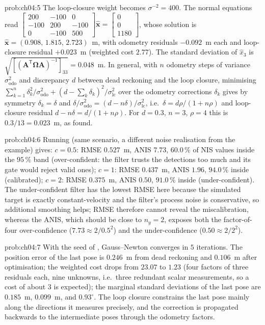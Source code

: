 \begin{sol}{prob:ch04:5}
The loop-closure weight becomes $\sigma^{-2}=400$. The normal equations read
$\begin{bmatrix}200&-100&0\\-100&200&-100\\0&-100&500\end{bmatrix}\widehat{\mathbf{x}}=\begin{bmatrix}0\\0\\1180\end{bmatrix}$, whose solution is $\widehat{\mathbf{x}}=(0.908,\,1.815,\,2.723)$~m, with odometry residuals $-0.092$~m each and loop-closure residual $+0.023$~m (weighted cost $2.77$). The standard deviation of $\widehat{x}_3$ is $\sqrt{[(\mathbf{A}^{\mathsf T}\mathbf{\Omega}\mathbf{A})^{-1}]_{33}}=0.048$~m. In general, with $n$ odometry steps of variance $\sigma_{\mathrm{odo}}^{2}$ and discrepancy $d$ between dead reckoning and the loop closure, minimising $\sum_{k=1}^{n}\delta_k^{2}/\sigma_{\mathrm{odo}}^{2}+(d-\sum_k\delta_k)^{2}/\sigma_{\mathrm{lc}}^{2}$ over the odometry corrections $\delta_k$ gives by symmetry $\delta_k=\delta$ and $\delta/\sigma_{\mathrm{odo}}^{2}=(d-n\delta)/\sigma_{\mathrm{lc}}^{2}$, i.e.\ $\delta=d\rho/(1+n\rho)$ and loop-closure residual $d-n\delta=d/(1+n\rho)$. For $d=0.3$, $n=3$, $\rho=4$ this is $0.3/13=0.023$~m, as found.
\end{sol}
\begin{sol}{prob:ch04:6}
Running  (same scenario, a different noise realisation from the example) gives: $c=0.5$: RMSE $0.527$~m, ANIS $7.73$, $60.0\,\%$ of NIS values inside the $95\,\%$ band (over-confident: the filter trusts the detections too much and its gate would reject valid ones); $c=1$: RMSE $0.437$~m, ANIS $1.96$, $94.0\,\%$ inside (calibrated); $c=2$: RMSE $0.375$~m, ANIS $0.50$, $91.0\,\%$ inside (under-confident). The under-confident filter has the lowest RMSE here because the simulated target is exactly constant-velocity and the filter's process noise is conservative, so additional smoothing helps; RMSE therefore cannot reveal the miscalibration, whereas the ANIS, which should be close to $n_y=2$, exposes both the factor-of-four over-confidence ($7.73\approx 2/0.5^{2}$) and the under-confidence ($0.50\approx2/2^{2}$).
\end{sol}
\begin{sol}{prob:ch04:7}
With the seed of , Gauss--Newton converges in $5$ iterations. The position error of the last pose is $0.246$~m from dead reckoning and $0.106$~m after optimisation; the weighted cost drops from $23.07$ to $1.23$ (four factors of three residuals each, nine unknowns, i.e.\ three redundant scalar measurements, so a cost of about $3$ is expected); the marginal standard deviations of the last pose are $0.185$~m, $0.099$~m, and $0.93^{\circ}$. The loop closure constrains the last pose mainly along the directions it measures precisely, and the correction is propagated backwards to the intermediate poses through the odometry factors.
\end{sol}
